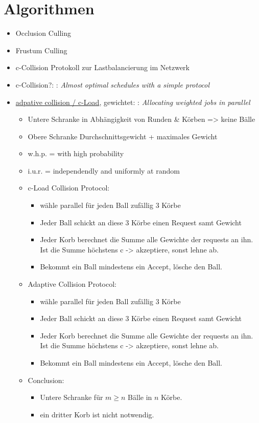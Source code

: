 \section{Algorithmen}
\label{sec:basics:algorithmen}
\begin{itemize}
  \item Occlusion Culling \cite{RTR3}
  \item Frustum Culling \cite{RTR3}
  \item c-Collision Protokoll zur Lastbalancierung im Netzwerk
  \item c-Collision?: \cite{DBLP:conf/arcs/RehbergS99}: \textit{Almost optimal schedules with a simple protocol}
  \item \underline{adpative collision / c-Load}, gewichtet: \cite{ccol2}: \textit{Allocating weighted jobs in parallel}
  \begin{itemize}
    \item Untere Schranke in Abhängigkeit von Runden \& Körben => keine Bälle
    \item Obere Schranke Durchschnittsgewicht + maximales Gewicht
    \item w.h.p. = with high probability
    \item i.u.r. = independendly and uniformly at random
    \item c-Load Collision Protocol:
    \begin{itemize}
      \item wähle parallel für jeden Ball zufällig 3 Körbe
      \item Jeder Ball schickt an diese 3 Körbe einen Request samt Gewicht
      \item Jeder Korb berechnet die Summe alle Gewichte der requests an ihn. Ist die Summe höchstens c -> akzeptiere, sonst lehne ab.
      \item Bekommt ein Ball mindestens ein Accept, lösche den Ball.
    \end{itemize}
    \item Adaptive Collision Protocol:
    \begin{itemize}
      \item wähle parallel für jeden Ball zufällig 3 Körbe
      \item Jeder Ball schickt an diese 3 Körbe einen Request samt Gewicht
      \item Jeder Korb berechnet die Summe alle Gewichte der requests an ihn. Ist die Summe höchstens c -> akzeptiere, sonst lehne ab.
      \item Bekommt ein Ball mindestens ein Accept, lösche den Ball.
    \end{itemize}
    \item Conclusion:
    \begin{itemize}
      \item Untere Schranke für $m \ge n$ Bälle in $n$ Körbe.
      \item ein dritter Korb ist nicht notwendig.
    \end{itemize}



\end{itemize}
\end{itemize}
